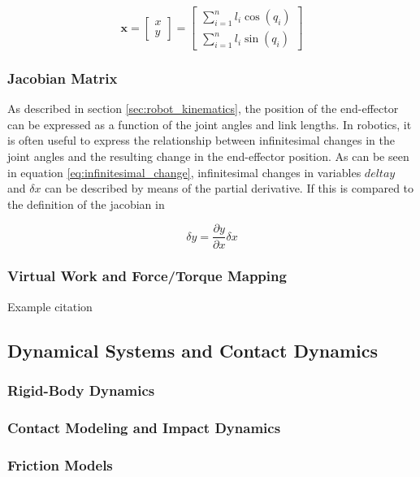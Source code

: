 \begin{equation}
    \label{eq:robot_kinematics}
    \mathbf{x} = \begin{bmatrix}
        x \\
        y
    \end{bmatrix} = \begin{bmatrix}
        \sum_{i=1}^{n} l_i \cos(q_i) \\
        \sum_{i=1}^{n} l_i \sin(q_i)
    \end{bmatrix}
\end{equation}


    \subsubsection{Jacobian Matrix}

As described in section \ref{sec:robot_kinematics}, the position of the end-effector can be expressed as a function of the joint angles and link lengths. In robotics, it is often useful to express the relationship between infinitesimal changes in the joint angles and the resulting change in the end-effector position. As can be seen in equation \ref{eq:infinitesimal_change}, infinitesimal changes in variables $delta y$ and $\delta x$ can be described by means of the partial derivative. If this is compared to the definition of the jacobian in 

\begin{equation}
    \label{eq:infinitesimal_change}
    \delta  y = \frac{\partial y}{\partial x} \delta x
\end{equation}


    \subsubsection{Virtual Work and Force/Torque Mapping}

    Example citation \cite{schulman_proximal_2017}

\subsection{Dynamical Systems and Contact Dynamics}
    \subsubsection{Rigid-Body Dynamics}
    \subsubsection{Contact Modeling and Impact Dynamics}
    \subsubsection{Friction Models}
